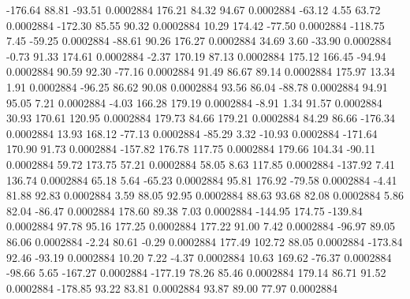      -176.64       88.81      -93.51     0.0002884
      176.21       84.32       94.67     0.0002884
      -63.12        4.55       63.72     0.0002884
     -172.30       85.55       90.32     0.0002884
       10.29      174.42      -77.50     0.0002884
     -118.75        7.45      -59.25     0.0002884
      -88.61       90.26      176.27     0.0002884
       34.69        3.60      -33.90     0.0002884
       -0.73       91.33      174.61     0.0002884
       -2.37      170.19       87.13     0.0002884
      175.12      166.45      -94.94     0.0002884
       90.59       92.30      -77.16     0.0002884
       91.49       86.67       89.14     0.0002884
      175.97       13.34        1.91     0.0002884
      -96.25       86.62       90.08     0.0002884
       93.56       86.04      -88.78     0.0002884
       94.91       95.05        7.21     0.0002884
       -4.03      166.28      179.19     0.0002884
       -8.91        1.34       91.57     0.0002884
       30.93      170.61      120.95     0.0002884
      179.73       84.66      179.21     0.0002884
       84.29       86.66     -176.34     0.0002884
       13.93      168.12      -77.13     0.0002884
      -85.29        3.32      -10.93     0.0002884
     -171.64      170.90       91.73     0.0002884
     -157.82      176.78      117.75     0.0002884
      179.66      104.34      -90.11     0.0002884
       59.72      173.75       57.21     0.0002884
       58.05        8.63      117.85     0.0002884
     -137.92        7.41      136.74     0.0002884
       65.18        5.64      -65.23     0.0002884
       95.81      176.92      -79.58     0.0002884
       -4.41       81.88       92.83     0.0002884
        3.59       88.05       92.95     0.0002884
       88.63       93.68       82.08     0.0002884
        5.86       82.04      -86.47     0.0002884
      178.60       89.38        7.03     0.0002884
     -144.95      174.75     -139.84     0.0002884
       97.78       95.16      177.25     0.0002884
      177.22       91.00        7.42     0.0002884
      -96.97       89.05       86.06     0.0002884
       -2.24       80.61       -0.29     0.0002884
      177.49      102.72       88.05     0.0002884
     -173.84       92.46      -93.19     0.0002884
       10.20        7.22       -4.37     0.0002884
       10.63      169.62      -76.37     0.0002884
      -98.66        5.65     -167.27     0.0002884
     -177.19       78.26       85.46     0.0002884
      179.14       86.71       91.52     0.0002884
     -178.85       93.22       83.81     0.0002884
       93.87       89.00       77.97     0.0002884
